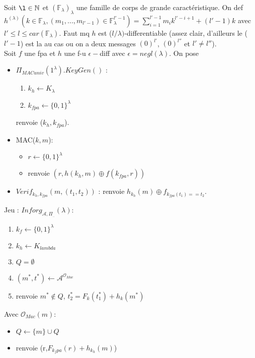 \documentclass[12pt]{article}
\theoremstyle{plain}
\theoremstyle{definition}
\theoremstyle{remark}
\newcommand{\A}{\mathcal{A}}
\newcommand{\N}{\mathbb{N}}
\newcommand{\Or}{\mathcal{O}}
\begin{document}
Soit $\l\in\N$ et $(\mathbb{F}_{\lambda})_{\lambda}$ une famille de corps de grande caractéristique. On def
$h^{(\lambda)}(k\in\mathbb{F}_{\lambda}, (m_1,...,m_{l'-1})\in\mathbb{F}_{\lambda}^{l'-1})
=\sum_{i=1}^{l'-1}m_i k^{l'-i+1}+(l'-1)k$ avec $l'\leq l\leq car(\mathbb{F}_{\lambda})$.
Faut mq $h$ est ($l/\lambda)$-differentiable (assez clair, d'ailleurs le ($l'-1$) est la au cas ou on a deux messages
$(0)^{l'}$, $(0)^{l''}$ et $l'\ne l''$).\\

Soit $f$ une fpa et $h$ une f-u $\epsilon-$diff avec $\epsilon=negl(\lambda)$. On pose \begin{itemize}
    \item $\Pi_{MACuniv}(1^{\lambda}).KeyGen()$ :\begin{enumerate}
                                                        \item $k_h\leftarrow K_{\lambda}$
                                                        \item $k_{fpa}\leftarrow \{0,1\}^{\lambda}$
    \end{enumerate}
    renvoie ($k_h,k_{fpa}$).
    \item MAC($k,m$): \begin{itemize}
        \item $r\leftarrow \{0,1\}^{\lambda}$
        \item renvoie $(r,h(k_h,m)\oplus f(k_{fpa}, r))$
    \end{itemize}
    \item $Verif_{k_h,k_{fpa}}(m,(t_1,t_2))$ : renvoie $h_{k_h}(m)\oplus f_{k_{fpa}(t_1)==t_2}$.
\end{itemize}

Jeu :
$Inforg_{\A,\Pi_{..}}(\lambda)$:
\begin{enumerate}
    \item $k_f\leftarrow\{0,1\}^{\lambda}$
    \item $k_h\leftarrow K_{lambda}$
    \item $Q=\emptyset$
    \item $(m^*,t^*)\leftarrow\A^{\Or_{Mac}}$
    \item renvoie $m^*\notin Q$, $t_2^*=F_k(t_1^*)+h_k(m^*)$
\end{enumerate}
Avec $\Or_{Mac}(m)$:
\begin{itemize}
    \item $Q\leftarrow\{m\}\cup Q$
    \item renvoie (r,$F_{k_fpa}(r)+h_{k_h}(m)$)
\end{itemize}
\end{document}
